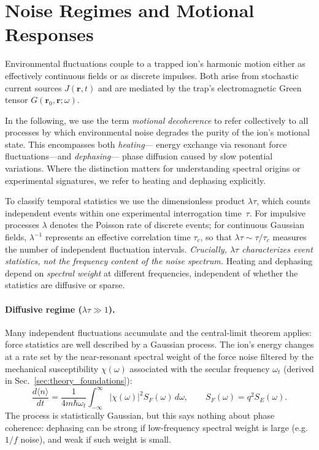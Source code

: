 \section{Noise Regimes and Motional Responses}
\label{sec:noise_regimes}

Environmental fluctuations couple to a trapped ion’s harmonic motion either
as effectively continuous fields or as discrete impulses.  Both arise from
stochastic current sources $J(\mathbf r,t)$ and are mediated by the trap’s
electromagnetic Green tensor $G(\mathbf r_0,\mathbf r;\omega)$.

In the following, we use the term \emph{motional decoherence} to refer
collectively to all processes by which environmental noise degrades the
purity of the ion’s motional state. This encompasses both \emph{heating}—
energy exchange via resonant force fluctuations—and \emph{dephasing}—
phase diffusion caused by slow potential variations. Where the distinction
matters for understanding spectral origins or experimental signatures,
we refer to heating and dephasing explicitly.

To classify temporal statistics we use the dimensionless product
$\lambda\tau$, which counts independent events within one experimental
interrogation time~$\tau$.  For impulsive processes $\lambda$ denotes the
Poisson rate of discrete events; for continuous Gaussian fields,
$\lambda^{-1}$ represents an effective correlation time $\tau_c$, so that
$\lambda\tau\!\sim\!\tau/\tau_c$ measures the number of independent
fluctuation intervals.  \emph{Crucially, $\lambda\tau$ characterizes event
statistics, not the frequency content of the noise spectrum.}
Heating and dephasing depend on \emph{spectral weight} at different
frequencies, independent of whether the statistics are diffusive or sparse.

\paragraph{Diffusive regime ($\lambda\tau\!\gg\!1$).}
Many independent fluctuations accumulate and the central-limit theorem
applies: force statistics are well described by a Gaussian process.
The ion’s energy changes at a rate set by the near-resonant spectral weight
of the force noise filtered by the mechanical susceptibility
$\chi(\omega)$ associated with the secular frequency $\omega_t$
(derived in Sec.~\ref{sec:theory_foundations}):
\[
\frac{d\langle n\rangle}{dt}
 = \frac{1}{4 m \hbar \omega_t}\!\int_{-\infty}^{\infty}\!
   |\chi(\omega)|^{2} S_F(\omega)\,d\omega,
\qquad S_F(\omega)=q^{2}S_E(\omega).
\]
The process is statistically Gaussian, but this says nothing about phase
coherence: dephasing can be strong if low-frequency spectral weight is large
(e.g.\ $1/f$ noise), and weak if such weight is small.

